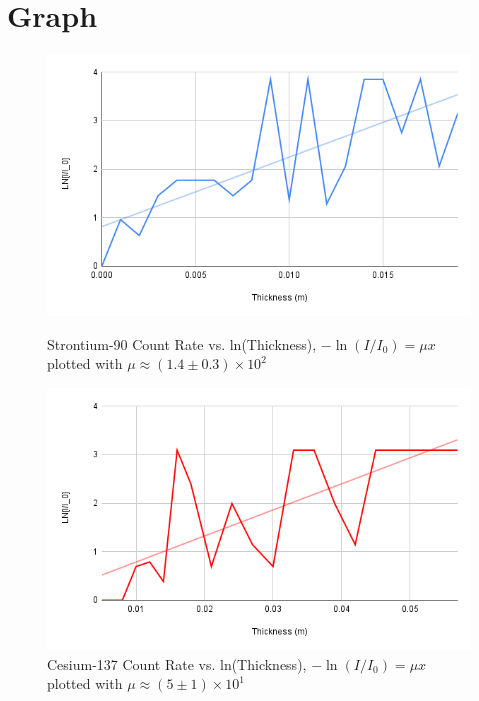 \documentclass[12pt]{article}
\begin{document}
\section{Graph}

\begin{figure}[H]
    \centering
    \begin{minipage}{0.45\textwidth}
        \centering
        \includegraphics[width=\textwidth]{strontium.png}
        \caption{Strontium-90 Count Rate vs. ln(Thickness), $-\ln(I/I_0) = \mu x$ plotted with $\mu \approx (1.4 \pm 0.3) \times 10^2$}
        \label{fig:cesium}
    \end{minipage}
    \hfill
    \begin{minipage}{0.45\textwidth}
        \centering
        \includegraphics[width=\textwidth]{cesium.png}
        \caption{Cesium-137 Count Rate vs. ln(Thickness), $-\ln(I/I_0) = \mu x$ plotted with $\mu \approx (5 \pm 1) \times 10^1$}
        \label{fig:strontium}
    \end{minipage}
\end{figure}
\end{document}
